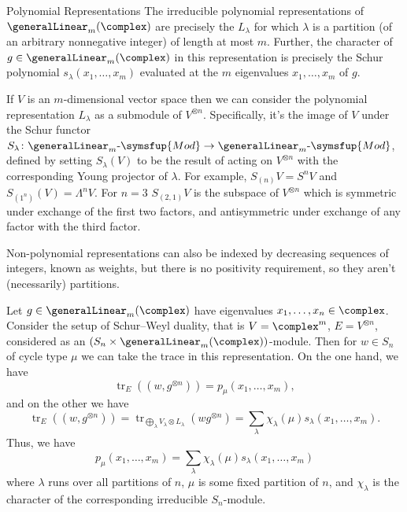 \documentclass[fleqn]{NotesClass}
\makeatletter
\newcommand{\c@egory}[1]{\symsfup{#1}}
\newcommand{\AMod}[1][A]{#1\text{-}\c@egory{Mod}}
\DeclareMathOperator{\tr}{tr}
\makeatother
\begin{document}
    \begin{thm}{Polynomial Representations}{}
        The irreducible polynomial representations of \(\generalLinear_m(\complex)\) are precisely the \(L_\lambda\) for which \(\lambda\) is a partition (of an arbitrary nonnegative integer) of length at most \(m\).
        Further, the character of \(g \in \generalLinear_m(\complex)\) in this representation is precisely the Schur polynomial \(s_\lambda(x_1, \dotsc, x_m)\) evaluated at the \(m\) eigenvalues \(x_1, \dotsc, x_m\) of \(g\).
    \end{thm}
    
    If \(V\) is an \(m\)-dimensional vector space then we can consider the polynomial representation \(L_\lambda\) as a submodule of \(V^{\otimes n}\).
    Specifically, it's the image of \(V\) under the Schur functor \(S_\lambda \colon \AMod[\generalLinear_m] \to \AMod[\generalLinear_m]\), defined by setting \(S_\lambda(V)\) to be the result of acting on \(V^{\otimes n}\) with the corresponding Young projector of \(\lambda\).
    For example, \(S_{(n)} V = S^n V\) and \(S_{(1^n)}(V) = \Lambda^nV\).
    For \(n = 3\) \(S_{(2,1)}V\) is the subspace of \(V^{\otimes n}\) which is symmetric under exchange of the first two factors, and antisymmetric under exchange of any factor with the third factor.
    
    Non-polynomial representations can also be indexed by decreasing sequences of integers, known as weights, but there is no positivity requirement, so they aren't (necessarily) partitions.
    
    Let \(g \in \generalLinear_m(\complex)\) have eigenvalues \(x_1, \dotsc, x_n \in \complex\).
    Consider the setup of Schur--Weyl duality, that is \(V = \complex^m\), \(E = V^{\otimes n}\), considered as an \((S_n \times \generalLinear_m(\complex))\)-module.
    Then for \(w \in S_n\) of cycle type \(\mu\) we can take the trace in this representation.
    On the one hand, we have
    \begin{equation}
        \tr_E((w, g^{\otimes n})) = p_\mu(x_1, \dotsc, x_m),
    \end{equation}
    and on the other we have
    \begin{equation}
        \tr_E((w, g^{\otimes n})) = \tr_{\bigoplus_\lambda V_\lambda \otimes L_\lambda}(wg^{\otimes n}) = \sum_\lambda \chi_\lambda(\mu) s_\lambda(x_1, \dotsc, x_m).
    \end{equation}
    Thus, we have
    \begin{equation}
        p_\mu(x_1, \dotsc, x_m) = \sum_{\lambda} \chi_\lambda(\mu) s_\lambda(x_1, \dotsc, x_m)
    \end{equation}
    where \(\lambda\) runs over all partitions of \(n\), \(\mu\) is some fixed partition of \(n\), and \(\chi_\lambda\) is the character of the corresponding irreducible \(S_n\)-module.
    
\end{document}
